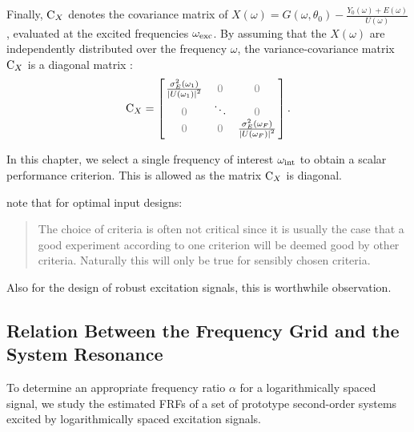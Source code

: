   Finally, $\mathrm{C}_{X}$ denotes the covariance matrix of $X\left(\omega\right) = G\left(\omega, \theta_0 \right) - \frac{Y_0\left(\omega \right) + E\left( \omega \right)  }{ U\left( \omega \right) } $, evaluated at the excited frequencies $\omega_{\mathrm{exc}}$.
  By assuming that the $X\left( \omega \right) $ are independently distributed over the frequency $\omega$, the variance-covariance matrix $\mathrm{C}_{X}$ is a diagonal matrix \citep{Pintelon2012}:
  \begin{equation}
    \C_{X} =
               \left[ \left.
               \begin{matrix}
                 \frac{\sigma^2_E\left(\omega_1 \right) }
                      {\abs{ U\left(\omega_1 \right)}^2 } & \deemph{0} & \deemph{0}\\
                 \deemph{0} & \ddots & \deemph{0} \\
                 \deemph{0} & \deemph{0} & \frac{\sigma^2_E\left(\omega_F \right) }
                              {\abs{U\left(\omega_F \right)}^2 }
               \end{matrix}
               \right.^{\vphantom{x}}\right]
    \text{.}
  \end{equation}

  In this chapter, we select a single frequency of interest $\omega_{\mathrm{int}}$ to obtain a scalar performance criterion.
  This is allowed as the matrix $\mathrm{C}_{X}$ is diagonal.

\begin{remark}
\citet{Goodwin1977} note that for optimal input designs:
\begin{quote}
The choice of criteria is often not critical since it is usually the case that a good experiment according to one criterion will be deemed good by other criteria. 
Naturally this will only be true for sensibly chosen criteria.
\end{quote}
Also for the design of robust excitation signals, this is worthwhile observation.
\end{remark}

  \subsection{Relation Between the Frequency Grid and the System Resonance} 
  \label{sec:excitation:relationLogGridSystem}
  To determine an appropriate frequency ratio $\alpha$ for a logarithmically spaced signal, we study the estimated \glspl{FRF} of a set of prototype second-order systems excited by logarithmically spaced excitation signals.

